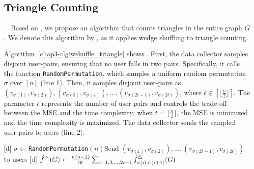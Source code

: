 \subsection{Triangle Counting}
\label{chap3-sub:triangle}
~~Based on
\AlgWSLE{},
we propose an algorithm that counts triangles in the entire graph $G$.
We denote this algorithm by \AlgWSTri{}, as it applies wedge shuffling to triangle counting.

Algorithm~\ref{chap3-alg:wshuffle_triangle} shows \AlgWSTri{}.
First, the data collector samples disjoint user-pairs, 
ensuring that no user falls in two pairs. 
Specifically, it calls the function \texttt{RandomPermutation}, which samples a uniform random permutation $\sigma$ over $[n]$ (line 1).
Then, it samples disjoint user-pairs as
$(v_{\sigma(1)}, v_{\sigma(2)}), (v_{\sigma(3)}, v_{\sigma(4)}), \ldots, (v_{\sigma(2t-1)}, \allowbreak v_{\sigma(2t)})$, where $t \in [\lfloor \frac{n}{2} \rfloor]$.
The parameter $t$ represents the number of user-pairs and controls the trade-off between the MSE and the time complexity;
when $t = \lfloor \frac{n}{2} \rfloor$, the MSE is minimized and the time complexity is maximized.
The data collector sends the sampled user-pairs to users (line 2).

\setlength{\algomargin}{5mm}
\begin{algorithm}[t]
  \SetAlgoLined
  [d] $\sigma \leftarrow$\texttt{RandomPermutation}$(n)$\;
  [d] Send $(v_{\sigma(1)}, v_{\sigma(2)}), \ldots, (v_{\sigma(2t-1)}, v_{\sigma(2t)})$ to users\;
  [d] $\hat{f}^\triangle(G) \leftarrow \frac{n(n-1)}{6t} \sum_{i=1, 3, \ldots, 2t-1} \hat{f}_{\sigma(i),\sigma(i+1)}^\triangle(G)$\;
  [d] 
  \caption[Our triangle counting algorithm \AlgWSTri{}.]{Our triangle counting algorithm \AlgWSTri{}.
  \AlgWSLE{} is shown in Algorithm~\ref{chap3-alg:WSLE}.
  }\label{chap3-alg:wshuffle_triangle}
\end{algorithm}

